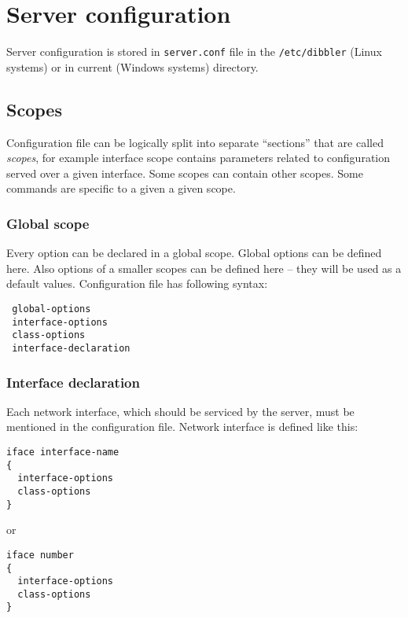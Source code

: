
\newpage
\section{Server configuration}
\label{server-conf}
Server configuration is stored in \verb+server.conf+ file in the
\verb+/etc/dibbler+ (Linux systems) or in current (Windows systems)
directory.

\subsection{Scopes}

Configuration file can be logically split into separate ``sections''
that are called \emph{scopes}, for example interface scope contains
parameters related to configuration served over a given interface.
Some scopes can contain other scopes. Some commands are specific to a
given a given scope.

\subsubsection{Global scope}
\label{server-global-scope}
Every option can be declared in a global scope. Global options can be
defined here. Also options of a smaller scopes can be defined here --
they will be used as a default values. Configuration file has following syntax:

\begin{lstlisting}
 global-options
 interface-options
 class-options
 interface-declaration
\end{lstlisting}

\subsubsection{Interface declaration}
\label{server-iface-scope}
Each network interface, which should be serviced by the server, must be
mentioned in the configuration file. Network interface is defined like this:
\begin{lstlisting}
iface interface-name
{
  interface-options
  class-options
}
\end{lstlisting}

or

\begin{lstlisting}
iface number
{
  interface-options
  class-options
}
\end{lstlisting}

